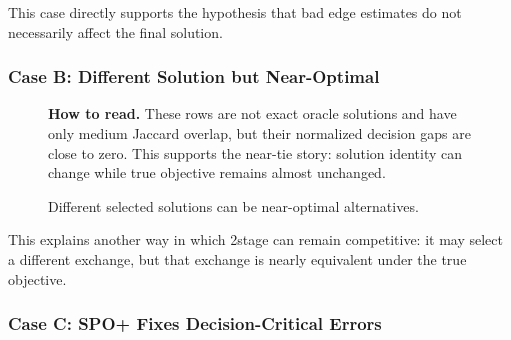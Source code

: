 \documentclass[11pt]{article}
\newcommand{\howtoread}[1]{%
  \par\smallskip
  \noindent\textbf{How to read.} #1%
}
\begin{document}
This case directly supports the hypothesis that bad edge estimates do not
necessarily affect the final solution.

\subsubsection*{Case B: Different Solution but Near-Optimal}

\begin{figure}[H]
\centering
\small
{}
\caption{Different selected solutions can be near-optimal alternatives.}
\label{fig:case-b}
\howtoread{These rows are not exact oracle solutions and have only medium Jaccard overlap, but their normalized decision gaps are close to zero. This supports the near-tie story: solution identity can change while true objective remains almost unchanged.}
\end{figure}

This explains another way in which 2stage can remain competitive: it may select
a different exchange, but that exchange is nearly equivalent under the true
objective.

\subsubsection*{Case C: SPO+ Fixes Decision-Critical Errors}
\end{document}
